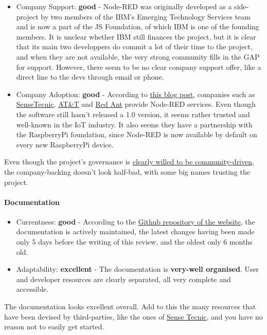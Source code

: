 \documentclass{article}
\begin{document}
\begin{itemize}
\item Company Support: \textbf{good} - Node-RED was originally developed as a side-project by two members of the IBM’s Emerging Technology Services team and is now a part of the JS Foundation, of which IBM is one of the founding members. It is unclear whether IBM still finances the project, but it is clear that its main two developpers do commit a lot of their time to the project, and when they are not available, the very strong community fills in the GAP for support. However, there seem to be no clear company support offer, like a direct line to the devs through email or phone.
\item Company Adoption: \textbf{good} - According to \href{https://nodered.org/blog/2016/10/17/js-foundation}{this blog post}, companies such as \href{https://fred.sensetecnic.com/}{SenseTecnic}, \href{https://flow.att.com/}{AT\&T} and \href{https://www.redconnect.io/}{Red Ant} provide Node-RED services. Even though the software still hasn't released a 1.0 version, it seems rather trusted and well-known in the IoT industry. It also seems they have a partnership with the RaspberryPi foundation, since Node-RED is now available by default on every new RaspberryPi device.
\end{itemize}

Even though the project's governance is \href{https://nodered.org/about/governance/}{clearly willed to be community-driven}, the company-backing doesn't look half-bad, with some big names trusting the project.

\paragraph{Documentation}

\begin{itemize}
\item Currentness: \textbf{good} - According to the \href{https://github.com/node-red/node-red.github.io/tree/master/docs}{Github repository of the website}, the documentation is actively maintained, the latest changes having been made only 5 days before the writing of this review, and the oldest only 6 months old.
\item Adaptability: \textbf{excellent} - The documentation is \textbf{very-well organised}. User and developer resources are clearly separated, all very complete and accessible.
\end{itemize}

The documentation looks excellent overall. Add to this the many resources that have been devised by third-parties, like the ones of \href{http://noderedguide.com/}{Sense Tecnic}, and you have no reason not to easily get started.
\end{document}
